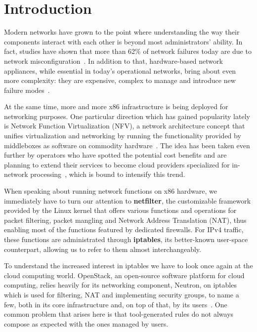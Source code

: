 \chapter{Introduction}


Modern networks have grown to the point where understanding the way their
components interact with each other is beyond most administrators' ability. In
fact, studies have shown that more than 62\% of network failures today are due
to network misconfiguration~\cite{alimi2008shadow}.  In addition to that,
hardware-based network appliances, while essential in today's operational
networks, bring about even more complexity: they are expensive, complex to
manage and introduce new failure modes~\cite{sherry2012making}.

At the same time, more and more x86 infrastructure is being deployed for
networking purposes. One particular direction which has gained popularity lately
is Network Function Virtualization (NFV), a network architecture concept that unifies virtualization and
networking by running the functionality provided by middleboxes as software on
commodity hardware~\cite{martins2014clickos, stoenescu2015net}. The idea has
been taken even further by operators who have spotted the potential cost
benefits and are planning to extend their services to become cloud providers
specialized for in-network processing~\cite{stoenescu2015net}, which is bound
to intensify this trend.

When speaking about running network functions on x86 hardware, we immediately
have to turn our attention to \textbf{netfilter}, the customizable framework
provided by the Linux kernel that offers various functions and operations for
packet filtering, packet mangling and Network Address Translation
(NAT), thus enabling most of the
functions featured by dedicated firewalls. For IPv4 traffic, these functions
are administrated through \textbf{iptables}, its better-known user-space
counterpart, allowing us to refer to them almost interchangeably.

To understand the increased interest in iptables we have to look once again at
the cloud computing world.  OpenStack, an open-source software platform for
cloud computing, relies heavily for its networking component, Neutron, on
iptables which is used for filtering, NAT and implementing security groups, to
name a few, both in its core infrastructure and, on top of that, by its
users~\cite{denton2014learning}.  One common problem that arises here is that
tool-generated rules do not always compose as expected with the ones managed by
users.

